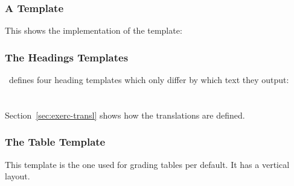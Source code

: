\documentclass{xsim-manual}
\begin{document}
\subsubsection{A  Template}
\label{sec:minimal-template}

This shows the implementation of the  template:
\begin{sourcecode}
    {%
      \textbf{}%
    }
    {}
\end{sourcecode}

\subsubsection{The Headings Templates}\label{sec:headings-templates}
\xsim\ defines four heading templates which only differ by which text they
output:
\begin{sourcecode}
    {\section*{}}
    {\section*{}}
    {\section*{}}
    {\section*{}}
\end{sourcecode}
Section~\vref{sec:exerc-transl} shows how the translations are defined.

\subsubsection{The  Table Template}\label{sec:table-templ-default}
This template is the one used for grading tables per default.  It has a
vertical layout.
\end{document}

